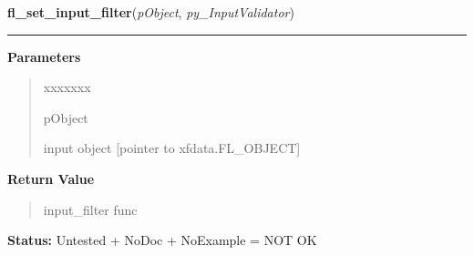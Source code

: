 \hspace{.8\funcindent}\begin{boxedminipage}{\funcwidth}

    \raggedright \textbf{fl\_set\_input\_filter}(\textit{pObject}, \textit{py\_InputValidator})

    \vspace{-1.5ex}

    \rule{\textwidth}{0.5\fboxrule}
\setlength{\parskip}{2ex}
\setlength{\parskip}{1ex}
      \textbf{Parameters}
      \vspace{-1ex}

      \begin{quote}
        \begin{Ventry}{xxxxxxx}

          \item[pObject]

          input object [pointer to xfdata.FL\_OBJECT]

        \end{Ventry}

      \end{quote}

      \textbf{Return Value}
    \vspace{-1ex}

      \begin{quote}
      input\_filter func

      \end{quote}

\textbf{Status:} Untested + NoDoc + NoExample = NOT OK



    \end{boxedminipage}

    \label{xformslib:library:fl_validate_input}

    \vspace{0.5ex}

